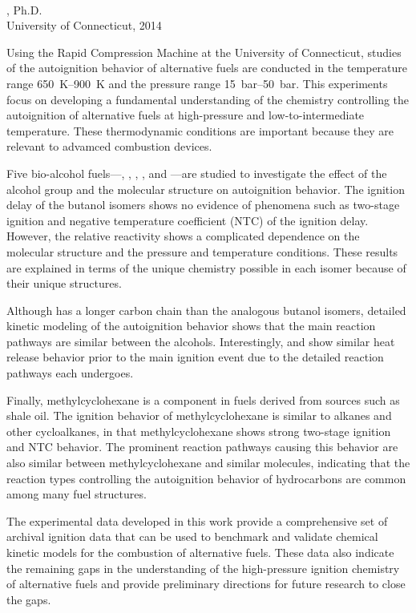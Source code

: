 \documentclass[12pt,letterpaper,oneside,draft]{book}
\begin{document}
\thispagestyle{empty}
\begin{center}
\thetitle \\
\theauthor, Ph.D. \\
University of Connecticut, 2014 \\
\blankline
\end{center}
Using the Rapid Compression Machine at the University of Connecticut,
studies of the autoignition behavior of alternative fuels are conducted
in the temperature range \SIrange{650}{900}{\kelvin} and the pressure
range \SIrange{15}{50}{\bar}. This experiments focus on developing a
fundamental understanding of the chemistry controlling the autoignition
of alternative fuels at high-pressure and low-to-intermediate temperature.
These thermodynamic conditions are important because they are relevant to
advamced combustion devices.

Five bio-alcohol fuels---\nBuOH{}, \sBuOH{}, \tBuOH{}, \iBuOH{},
and \iPeOH{}---are studied to investigate the effect of the alcohol group
and the molecular structure on autoignition behavior. The ignition delay of the butanol
isomers shows no evidence of phenomena such as two-stage ignition and
negative temperature coefficient (NTC) of the ignition delay. However, the relative
reactivity shows a complicated dependence on the molecular structure and
the pressure and temperature conditions.
These results are explained in terms of the unique chemistry possible in
each isomer because of their unique structures.

Although \iPeOH{} has a longer carbon chain than the analogous butanol
isomers, detailed kinetic modeling of the autoignition behavior shows
that the main reaction pathways are similar between the alcohols.
Interestingly, \iPeOH{} and \tBuOH{} show similar heat release behavior
prior to the main ignition event due to the detailed reaction pathways
each undergoes.

Finally, methylcyclohexane is a component in fuels derived from sources such as shale oil. The ignition behavior of methylcyclohexane
is similar to alkanes and other cycloalkanes, in that
methylcyclohexane shows strong two-stage ignition and NTC behavior. The prominent reaction pathways causing this behavior
are also similar between methylcyclohexane and similar molecules, indicating that
the reaction types controlling the autoignition behavior of hydrocarbons are
common among many fuel structures.

The experimental data developed in this work provide a comprehensive set
of archival ignition data that can be used to benchmark and validate
chemical kinetic models for the combustion of alternative fuels. These
data also indicate the remaining gaps in the understanding of the
high-pressure ignition chemistry of alternative fuels and provide preliminary
directions for future research to close the gaps.
\end{document}
